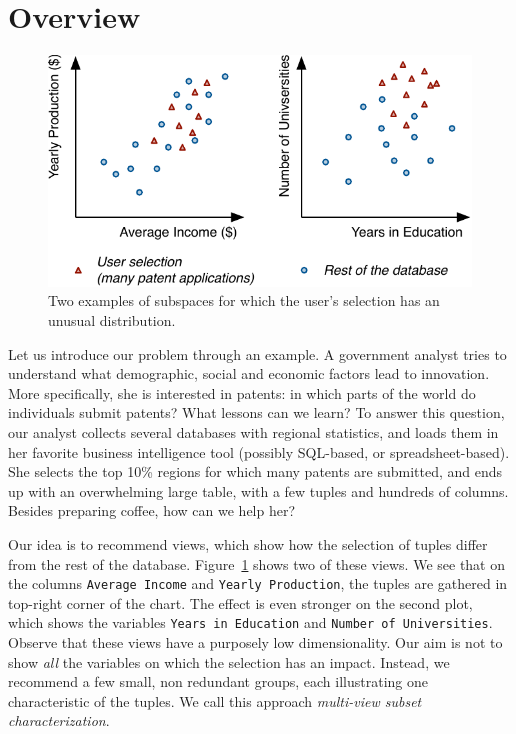 \section{Overview}
\label{sec:overview}
\begin{figure}
  \centering
  \includegraphics[width=\columnwidth]{Figures/Example}
  \caption{Two examples of subspaces for which the user's selection has an
  unusual distribution.}
  \label{pic:example}
\end{figure}
Let us introduce our problem through an example. A government analyst tries to
understand what demographic, social and economic factors lead to innovation.
More specifically, she is interested in patents: in which parts of the world do
individuals submit patents? What lessons can we learn? To answer this question,
our analyst collects several databases with regional statistics, and loads them
in her favorite business intelligence tool (possibly SQL-based, or
spreadsheet-based). She selects the top 10\% regions for which many patents are
submitted, and ends up with an overwhelming large table, with a few tuples and
hundreds of columns. Besides preparing coffee, how can we help her?
 
Our idea is to recommend views, which show how the selection of tuples differ
from the rest of the database. Figure~\ref{pic:example} shows two of these
views. We see that on the columns \texttt{Average Income} and \texttt{Yearly
Production}, the tuples are gathered in top-right corner of the chart. The
effect is even stronger on the second plot, which shows the variables
\texttt{Years in Education} and \texttt{Number of Universities}. Observe that
these views have a purposely low dimensionality. Our aim is not to show
\emph{all} the variables on which the selection has an impact. Instead, we
recommend a few small, non redundant groups, each illustrating one
characteristic of the tuples. We call this approach \emph{multi-view subset
characterization}.

